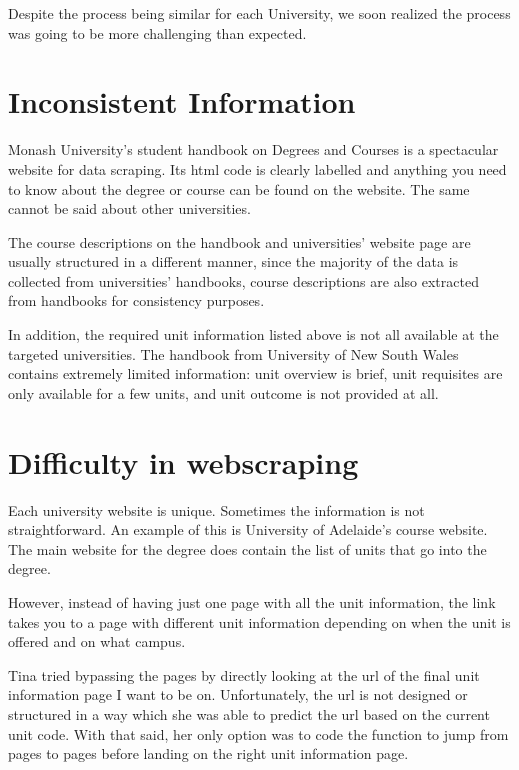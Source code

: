 \documentclass[
  letterpaper,
]{report}
\begin{document}
Despite the process being similar for each University, we soon realized
the process was going to be more challenging than expected.

\hypertarget{inconsistent-information}{%
\section{Inconsistent Information}\label{inconsistent-information}}

Monash University's student handbook on Degrees and Courses is a
spectacular website for data scraping. Its html code is clearly labelled
and anything you need to know about the degree or course can be found on
the website. The same cannot be said about other universities.

The course descriptions on the handbook and universities' website page
are usually structured in a different manner, since the majority of the
data is collected from universities' handbooks, course descriptions are
also extracted from handbooks for consistency purposes.

In addition, the required unit information listed above is not all
available at the targeted universities. The handbook from University of
New South Wales contains extremely limited information: unit overview is
brief, unit requisites are only available for a few units, and unit
outcome is not provided at all.

\hypertarget{difficulty-in-webscraping}{%
\section{Difficulty in webscraping}\label{difficulty-in-webscraping}}

Each university website is unique. Sometimes the information is not
straightforward. An example of this is University of Adelaide's course
website. The main website for the degree does contain the list of units
that go into the degree.

However, instead of having just one page with all the unit information,
the link takes you to a page with different unit information depending
on when the unit is offered and on what campus.

Tina tried bypassing the pages by directly looking at the url of the
final unit information page I want to be on. Unfortunately, the url is
not designed or structured in a way which she was able to predict the
url based on the current unit code. With that said, her only option was
to code the function to jump from pages to pages before landing on the
right unit information page.
\end{document}
